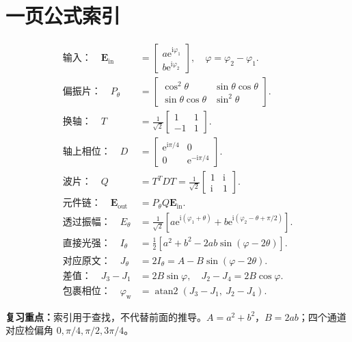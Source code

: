 \documentclass[UTF8,fontset=fandol,11pt,a4paper]{ctexart}
\newcommand{\ii}{\mathrm i}
\newcommand{\ee}{\mathrm e}
\newcommand{\note}[1]{\par\noindent\colorbox{pale}{\parbox{\dimexpr\linewidth-2\fboxsep\relax}{\textbf{复习重点：}#1}}\par}
\newcommand{\colvec}[2]{\begin{bmatrix}#1\\#2\end{bmatrix}}
\begin{document}
\section*{一页公式索引}
\begin{align*}
\text{输入：}\quad
\mathbf E_{\mathrm{in}}&=\colvec{a\ee^{\ii\varphi_1}}{b\ee^{\ii\varphi_2}},
\quad\varphi=\varphi_2-\varphi_1.\\[5pt]
\text{偏振片：}\quad P_\theta&=
\begin{bmatrix}\cos^2\theta&\sin\theta\cos\theta\\
\sin\theta\cos\theta&\sin^2\theta\end{bmatrix}.\\[5pt]
\text{换轴：}\quad T&=\frac1{\sqrt2}\begin{bmatrix}1&1\\-1&1\end{bmatrix}.\\[5pt]
\text{轴上相位：}\quad D&=\begin{bmatrix}\ee^{\ii\pi/4}&0\\0&\ee^{-\ii\pi/4}\end{bmatrix}.\\[5pt]
\text{波片：}\quad Q&=T^TDT=\frac1{\sqrt2}\begin{bmatrix}1&\ii\\\ii&1\end{bmatrix}.\\[5pt]
\text{元件链：}\quad\mathbf E_{\mathrm{out}}&=P_\theta Q\mathbf E_{\mathrm{in}}.\\[5pt]
\text{透过振幅：}\quad E_\theta&=\frac1{\sqrt2}
\left[a\ee^{\ii(\varphi_1+\theta)}+b\ee^{\ii(\varphi_2-\theta+\pi/2)}\right].\\[5pt]
\text{直接光强：}\quad I_\theta&=\frac12[a^2+b^2-2ab\sin(\varphi-2\theta)].\\[5pt]
\text{对应原文：}\quad J_\theta&=2I_\theta=A-B\sin(\varphi-2\theta).\\[5pt]
\text{差值：}\quad J_3-J_1&=2B\sin\varphi,\quad J_2-J_4=2B\cos\varphi.\\[5pt]
\text{包裹相位：}\quad\varphi_{\mathrm w}&=\operatorname{atan2}(J_3-J_1,\ J_2-J_4).
\end{align*}
\note{索引用于查找，不代替前面的推导。$A=a^2+b^2$，$B=2ab$；四个通道对应检偏角 $0,\pi/4,\pi/2,3\pi/4$。}
\end{document}
